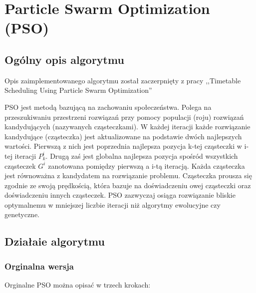 
\section{Particle Swarm Optimization (PSO)}
\author{Paweł Jastrzębski}
\subsection{Ogólny opis algorytmu}
\par Opis zaimplementowanego algorytmu został zaczerpnięty z pracy ,,Timetable Scheduling Using Particle Swarm Optimization'' \cite{pso}
\par PSO jest metodą bazującą na zachowaniu społeczeństwa. Polega na przeszukiwaniu przestrzeni rozwiązań przy pomocy populacji (roju) rozwiązań kandydujących (nazywanych cząsteczkami). W każdej iteracji każde rozwiązanie kandydujące (cząsteczka) jest aktualizowane na podstawie dwóch najlepszych wartości. Pierwszą z nich jest poprzednia najlepsza pozycja k-tej cząsteczki w i-tej iteracji ${P}^{i}_{k}$. Drugą zaś jest globalna najlepsza pozycja spośród wszystkich cząsteczek ${G}^{i}$ zanotowana pomiędzy pierwszą a i-tą iteracją. Każda cząsteczka jest równoważna z kandydatem na rozwiązanie problemu. Cząsteczka prousza się zgodnie ze swoją prędkością, która bazuje na doświadczeniu owej cząsteczki oraz doświadczeniu innych cząsteczek. PSO zazwyczaj osiąga rozwiązanie bliskie optymalnemu w mniejszej liczbie iteracji niż algorytmy ewolucyjne czy genetyczne.  \subsection{Działaie algorytmu}
\subsubsection{Orginalna wersja}
\par Orginalne PSO można opisać w trzech krokach:

